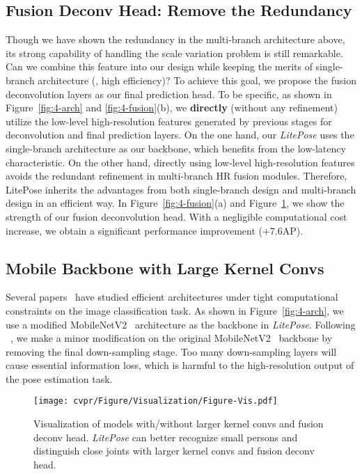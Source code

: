 \documentclass[10pt,twocolumn,letterpaper]{article}
\begin{document}
\subsection{Fusion Deconv Head: Remove the Redundancy}

Though we have shown the redundancy in the multi-branch architecture above, its strong capability of handling the scale variation problem is still remarkable. Can we combine this feature into our design while keeping the merits of single-branch architecture (\eg, high efficiency)? To achieve this goal, we propose the fusion deconvolution layers as our final prediction head. To be specific, as shown in Figure~\ref{fig:4-arch} and \ref{fig:4-fusion}(b), we \textbf{directly} (\ie without any refinement) utilize the low-level high-resolution features generated by previous stages for deconvolution and final prediction layers. On the one hand, our \textit{LitePose} uses the single-branch architecture as our backbone, which benefits from the low-latency characteristic. On the other hand, directly using low-level high-resolution features avoids the redundant refinement in multi-branch HR fusion modules. Therefore, LitePose inherits the advantages from both single-branch design and multi-branch design in an efficient way. In Figure~\ref{fig:4-fusion}(a) and Figure~\ref{fig:visualization}, we show the strength of our fusion deconvolution head. With a negligible computational cost increase, we obtain a significant performance improvement (+7.6AP).

\subsection{Mobile Backbone with Large Kernel Convs}

Several papers~\cite{howard2017mobilenets,sandler2018mobilenetv2,ma2018shufflenet,zhang2018shufflenet} have studied efficient architectures under tight computational constraints on the image classification task. As shown in Figure~\ref{fig:4-arch}, we use a modified MobileNetV2~\cite{sandler2018mobilenetv2} architecture as the backbone in \textit{LitePose}. Following ~\cite{zhang2020efficientpose}, we make a minor modification on the original MobileNetV2~\cite{sandler2018mobilenetv2} backbone by removing the final down-sampling stage. Too many down-sampling layers will cause essential information loss, which is harmful to the high-resolution output of the pose estimation task.

\begin{figure}
\centering
	\texttt{[image: cvpr/Figure/Visualization/Figure-Vis.pdf]}
\caption{Visualization of models with/without larger kernel convs and fusion deconv head. \textit{LitePose} can better recognize small persons and distinguish close joints with larger kernel convs and fusion deconv head.}
\label{fig:visualization}
\end{figure}
 
\end{document}
